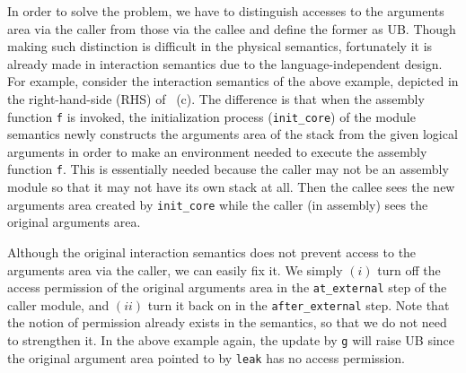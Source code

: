 %
In order to solve the problem, we have to distinguish accesses to the
arguments area via the caller from those via the callee and define the
former as UB. Though making such distinction is difficult in the
physical semantics, fortunately it is already made in interaction
semantics due to the language-independent design. For example, consider
the interaction semantics of the above example, depicted in the
right-hand-side (RHS) of ~(c).  The
difference is that when the assembly function \texttt{f} is invoked,
the initialization process (\ie \texttt{init\_core}) of the module
semantics newly constructs the arguments area of the stack from the
given logical arguments in order to make an environment needed to
execute the assembly function \texttt{f}. This is essentially needed
because the caller may not be an assembly module so that it may not
have its own stack at all.  Then the callee sees the new arguments
area created by \texttt{init\_core} while the caller (in assembly)
sees the original arguments area.

Although the original interaction semantics does not prevent access to
the arguments area via the caller, we can easily fix it.
We simply $(i)$ turn off the access
permission of the original arguments area in the \texttt{at\_external}
step of the caller module, and $(ii)$ turn it back on in the
\texttt{after\_external} step. Note that the notion of permission
already exists in the \cc{} semantics, so that we do not
need to strengthen it. In the above example again,
the update by \texttt{g} will raise UB since the original argument area pointed
to by \texttt{leak} has no access permission.


